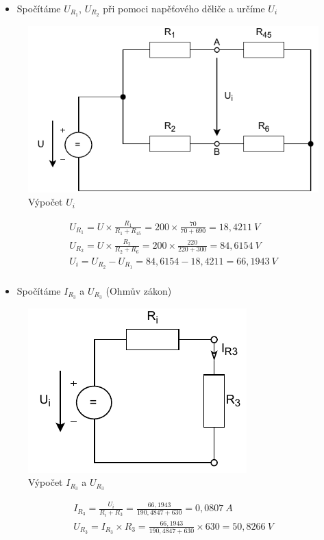 \newpage

\begin{itemize}
    \item Spočítáme $U_{R_1}$, $U_{R_2}$ při pomoci napěťového děliče a určíme $U_i$
\end{itemize}

\begin{figure}[h]
    \centering
    \includegraphics[scale=0.8,keepaspectratio]{fig/Pr2_krok3.pdf}
    \caption{Výpočet $U_i$}
    \label{pic:Pr2_krok3}
\end{figure}

\begin{center}
    \begin{gather*}
        U_{R_1} = U \times \frac{R_1}{R_1 + R_{45}} = 200 \times \frac{70}{70+690} = 18,4211 \: V \\[6pt]
        U_{R_2} = U \times \frac{R_2}{R_2 + R_6} = 200 \times \frac{220}{220+300} = 84,6154 \: V \\[6pt]
        U_i = U_{R_2} - U_{R_1} = 84,6154 - 18,4211 = 66,1943 \: V \\
    \end{gather*}
\end{center}

\begin{itemize}
    \item Spočítáme $I_{R_3}$ a $U_{R_3}$ (Ohmův zákon)
\end{itemize}

\begin{figure}[h]
    \centering
    \includegraphics[scale=0.8,keepaspectratio]{fig/Pr2_krok4.pdf}
    \caption{Výpočet $I_{R_3}$ a $U_{R_3}$}
    \label{pic:Pr2_krok4}
\end{figure}

\begin{center}
    \begin{gather*}
        I_{R_3} = \frac{U_i}{R_i + R_3} = \frac{66,1943}{190,4847+630} = 0,0807 \: A \\[6pt]
        U_{R_3} = I_{R_3} \times R_3 = \frac{66,1943}{190,4847+630} \times 630 = 50,8266 \: V
    \end{gather*}
\end{center}